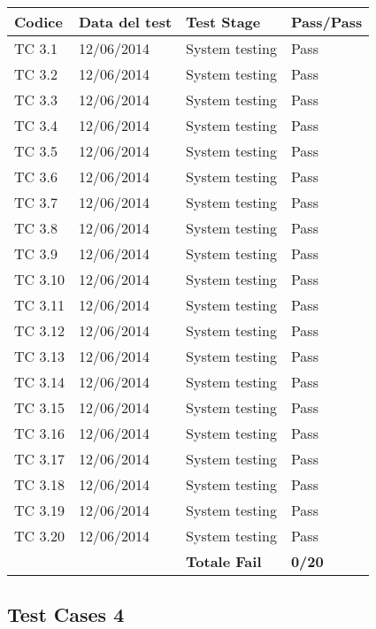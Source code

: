 \begin{tabular}{|p{3cm}|p{3cm}|p{3cm}|p{3cm}|}
	\hline
	\rowcolor{Gray}
	\textbf{Codice} & \textbf{Data del test} & \textbf{Test Stage} & \textbf{Pass/Pass}\tabularnewline
	\hline
	TC 3.1			& 12/06/2014 			& System testing		& Pass \tabularnewline
	\hline
	TC 3.2			& 12/06/2014 			& System testing		& Pass \tabularnewline
	\hline
	TC 3.3			& 12/06/2014 			& System testing		& Pass \tabularnewline
	\hline
	TC 3.4			& 12/06/2014 			& System testing		& Pass \tabularnewline
	\hline
	TC 3.5			& 12/06/2014 			& System testing		& Pass \tabularnewline
	\hline
	TC 3.6			& 12/06/2014 			& System testing		& Pass \tabularnewline
	\hline
	TC 3.7			& 12/06/2014 			& System testing		& Pass \tabularnewline
	\hline
	TC 3.8			& 12/06/2014 			& System testing		& Pass \tabularnewline
	\hline
	TC 3.9			& 12/06/2014 			& System testing		& Pass \tabularnewline
	\hline
	TC 3.10			& 12/06/2014 			& System testing		& Pass \tabularnewline
	\hline
	TC 3.11			& 12/06/2014 			& System testing		& Pass \tabularnewline
	\hline
	TC 3.12			& 12/06/2014 			& System testing		& Pass \tabularnewline
	\hline
	TC 3.13			& 12/06/2014 			& System testing		& Pass \tabularnewline
	\hline
	TC 3.14			& 12/06/2014 			& System testing		& Pass \tabularnewline
	\hline
	TC 3.15			& 12/06/2014 			& System testing		& Pass \tabularnewline
	\hline
	TC 3.16			& 12/06/2014 			& System testing		& Pass \tabularnewline
	\hline
	TC 3.17			& 12/06/2014 			& System testing		& Pass \tabularnewline
	\hline
	TC 3.18			& 12/06/2014 			& System testing		& Pass \tabularnewline
	\hline
	TC 3.19			& 12/06/2014 			& System testing		& Pass \tabularnewline
	\hline
	TC 3.20			& 12/06/2014 			& System testing		& Pass \tabularnewline
	\hline
					& 						& \textbf{Totale Fail}	& \textbf{0/20} \tabularnewline
	\hline
\end{tabular}

\subsection{Test Cases 4}

